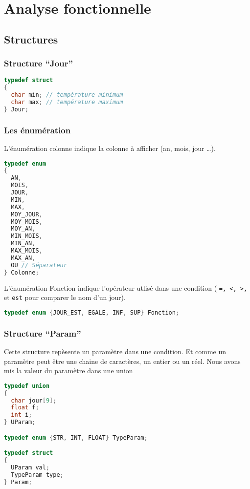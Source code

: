 \section{Analyse fonctionnelle}

\subsection{Structures}

\subsubsection{Structure ``Jour''}

\begin{lstlisting}[language=C]
typedef struct
{
  char min; // température minimum
  char max; // température maximum
} Jour;
\end{lstlisting}

\subsubsection{Les énumération}

L'énumération colonne indique la colonne à afficher (an, mois, jour \ldots).
\begin{lstlisting}[language=C]
typedef enum
{
  AN,
  MOIS,
  JOUR,
  MIN,
  MAX,
  MOY_JOUR,
  MOY_MOIS,
  MOY_AN,
  MIN_MOIS,
  MIN_AN,
  MAX_MOIS,
  MAX_AN,
  OU // Séparateur
} Colonne;

\end{lstlisting}

L'énumération Fonction indique l'opérateur utlisé dans une condition ( 
\lstinline$=, <, >, $ et \lstinline$est$ pour comparer le nom d'un jour).
  
\begin{lstlisting}[language=C]
typedef enum {JOUR_EST, EGALE, INF, SUP} Fonction;
\end{lstlisting}

\subsubsection{Structure ``Param''}

Cette structure repèsente un paramètre dans une condition. Et comme un
paramètre peut être une chaine de caractères, un entier ou un réel. 
Nous avons mis la valeur du paramètre dans une union

\begin{lstlisting}[language=C]
typedef union
{
  char jour[9];
  float f;
  int i;
} UParam;	

typedef enum {STR, INT, FLOAT} TypeParam;

typedef struct
{
  UParam val;
  TypeParam type;
} Param;
\end{lstlisting}

